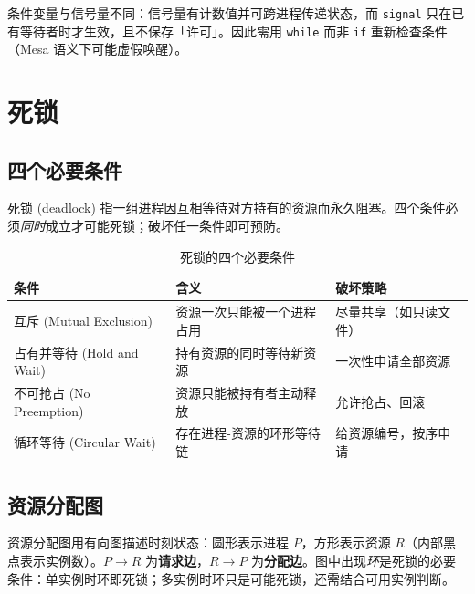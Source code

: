 条件变量与信号量不同：信号量有计数值并可跨进程传递状态，而 \texttt{signal} 只在已有等待者时才生效，且不保存「许可」。因此需用 \texttt{while} 而非 \texttt{if} 重新检查条件（Mesa 语义下可能虚假唤醒）。

\section{死锁}

\subsection{四个必要条件}

死锁 (deadlock) 指一组进程因互相等待对方持有的资源而永久阻塞。四个条件必须\emph{同时}成立才可能死锁；破坏任一条件即可预防。

\begin{table}[H]
\centering
\caption{死锁的四个必要条件}
\begin{tabulary}{\textwidth}{LLL}
\toprule
条件 & 含义 & 破坏策略 \\
\midrule
互斥 (Mutual Exclusion) & 资源一次只能被一个进程占用 & 尽量共享（如只读文件） \\
占有并等待 (Hold and Wait) & 持有资源的同时等待新资源 & 一次性申请全部资源 \\
不可抢占 (No Preemption) & 资源只能被持有者主动释放 & 允许抢占、回滚 \\
循环等待 (Circular Wait) & 存在进程-资源的环形等待链 & 给资源编号，按序申请 \\
\bottomrule
\end{tabulary}
\end{table}

\subsection{资源分配图}

资源分配图用有向图描述时刻状态：圆形表示进程 $P$，方形表示资源 $R$（内部黑点表示实例数）。$P \to R$ 为\textbf{请求边}，$R \to P$ 为\textbf{分配边}。图中出现\emph{环}是死锁的必要条件：单实例时环即死锁；多实例时环只是可能死锁，还需结合可用实例判断。

